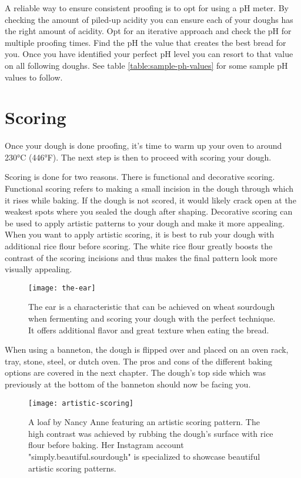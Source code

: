 A reliable way to ensure consistent proofing is to opt for using a pH
meter. By checking the amount of piled-up acidity you can ensure
each of your doughs has the right amount of acidity. Opt for an iterative
approach and check the pH for multiple proofing times. Find the pH
the value that creates the best bread for you. Once you have identified
your perfect pH level you can resort to that value on all following
doughs. See table \ref{table:sample-ph-values} for some sample pH values
to follow.

\section{Scoring}

Once your dough is done proofing, it's time to warm up your oven
to around 230°C (446°F). The next step is then to proceed with
scoring your dough.

Scoring is done for two reasons. There is functional and decorative
scoring. Functional scoring refers to making a small incision in the dough
through which it rises while baking. If the dough is not scored,
it would likely crack open at the weakest spots where you sealed
the dough after shaping. Decorative scoring can be used to apply
artistic patterns to your dough and make it more appealing. When
you want to apply artistic scoring, it is best to rub your dough
with additional rice flour before scoring. The white rice flour
greatly boosts the contrast of the scoring incisions and thus
makes the final pattern look more visually appealing.

\begin{figure}[htb!]
  \texttt{[image: the-ear]}
  \caption{The ear is a characteristic that can be achieved on wheat sourdough
  when fermenting and scoring your dough with the perfect technique. It offers additional
  flavor and great texture when eating the bread.}
  \label{fig:the-ear}
\end{figure}

When using a banneton, the dough is flipped over and
placed on an oven rack, tray, stone, steel, or dutch oven. The pros
and cons of the different baking options are covered in the next chapter.
The dough's top side which was previously at the bottom of the
banneton should now be facing you.

\begin{figure}[htb!]
  \texttt{[image: artistic-scoring]}
  \caption{A loaf by Nancy Anne featuring an artistic scoring pattern.
  The high contrast was achieved by rubbing the 
  dough's surface with rice flour before baking. Her Instagram
  account "simply.beautiful.sourdough" is specialized to showcase
  beautiful artistic scoring patterns.}
  \label{fig:artistic-scoring}
\end{figure}

